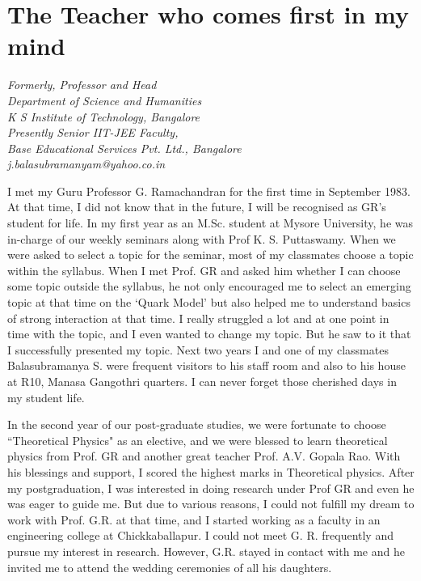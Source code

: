 
\chapter{The Teacher who comes first in my mind}\label{chap33}


\begin{center}
\textit{Formerly, Professor and Head}\\
\textit{Department of Science and Humanities}\\
\textit{K S Institute of Technology, Bangalore}\\
\textit{Presently Senior IIT-JEE Faculty, }\\
\textit{Base Educational Services Pvt. Ltd., Bangalore}\\
\textit{j.balasubramanyam@yahoo.co.in}
\end{center}


I met my Guru Professor G. Ramachandran for the first time in September 1983. At that time, I did not know that in the future, I will be recognised as GR's student for life. In my first year as an M.Sc. student at Mysore University, he was in-charge of our weekly seminars along with Prof K. S. Puttaswamy. When we were asked to select a topic for the seminar, most of my classmates choose a topic within the syllabus. When I met Prof. GR and asked him whether I can choose some topic outside the syllabus, he not only encouraged me to select an emerging topic at that time on the `Quark Model' but also helped me to understand basics of strong interaction at that time. I really struggled a lot and at one point in time with the topic, and I even wanted to change my topic. But he saw to it that I successfully presented my topic. Next two years I and one of my classmates Balasubramanya S. were frequent visitors to his staff room and also to his house at R10, Manasa Gangothri quarters. I can never forget those cherished days in my student life. 

In the second year of our post-graduate studies, we were fortunate to choose ``Theoretical Physics" as an elective, and we were blessed to learn theoretical physics from Prof. GR and another great teacher Prof. A.V. Gopala Rao. With his blessings and support, I scored the highest marks in Theoretical physics. After my postgraduation, I was interested in doing research under Prof GR and even he was eager to guide me. But due to various reasons, I could not fulfill my dream to work with Prof. G.R. at that time, and I started working as a faculty in an engineering college at Chickkaballapur. I could not meet G. R. frequently and pursue my interest in research. However, G.R. stayed in contact with me and he invited me to attend the wedding ceremonies of all his daughters. 

